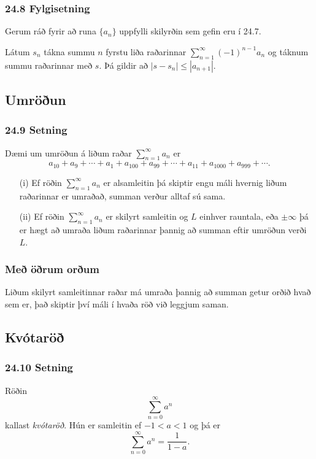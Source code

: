  \subsubsection{24.8 Fylgisetning}
Gerum ráð fyrir að runa $\{a_n\}$ uppfylli skilyrðin sem gefin eru í
24.7. \pause

Látum $s_n$ tákna summu $n$ fyrstu liða raðarinnar 
$\sum_{n=1}^\infty (-1)^{n-1}a_n$ og táknum summu raðarinnar með $s$.
Þá gildir að $|s-s_n|\leq |a_{n+1}|$.
 


\subsection[t]{Umröðun}
 \subsubsection{24.9 Setning}
Dæmi um umröðun á liðum raðar $\sum_{n=1}^\infty a_n$ er
$$a_{10}+a_9+\cdots+a_1+a_{100}+a_{99}+\cdots+a_{11}+
a_{1000}+a_{999}+\cdots.$$\pause
\begin{itemize}
\item[(i)]  Ef röðin $\sum_{n=1}^\infty a_n$ er alsamleitin þá skiptir
  engu máli hvernig liðum raðarinnar er umraðað, summan verður
  alltaf sú sama.  \pause
\item[(ii)]  Ef röðin $\sum_{n=1}^\infty a_n$ er skilyrt samleitin
og $L$ einhver rauntala, eða $\pm\infty$ þá er hægt að
umraða liðum raðarinnar þannig að summan eftir umröðun verði
$L$.
\end{itemize}
 

\pause
\subsubsection{Með öðrum orðum}
 Liðum skilyrt samleitinnar raðar má umraða þannig að summan getur orðið hvað sem
er, \pause það skiptir því máli í hvaða röð við leggjum saman.




\subsection[t]{Kvótaröð}
 \subsubsection{24.10 Setning}
  Röðin 
$$
\sum_{n=0}^\infty a^n
$$ 
kallast \emph{kvótaröð}. \pause Hún er samleitin ef $-1<a<1$ og þá er 
$$
\sum_{n=0}^\infty a^n = \frac{1}{1-a}.
$$ 
 



